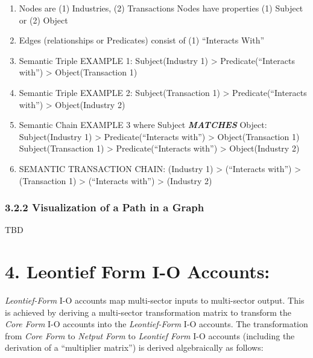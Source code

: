 \documentclass[
  letterpaper,
  DIV=11,
  numbers=noendperiod]{scrreprt}
\begin{document}
\begin{enumerate}
\def\labelenumi{\alph{enumi})}
\item
  Nodes are (1) Industries, (2) Transactions Nodes have properties (1)
  Subject or (2) Object
\item
  Edges (relationships or Predicates) consist of (1) ``Interacts With''
\item
  Semantic Triple EXAMPLE 1: Subject(Industry 1) \textgreater{}
  Predicate(``Interacts with'') \textgreater{} Object(Transaction 1)
\item
  Semantic Triple EXAMPLE 2: Subject(Transaction 1) \textgreater{}
  Predicate(``Interacts with'') \textgreater{} Object(Industry 2)
\item
  Semantic Chain EXAMPLE 3 where Subject \textbf{\emph{MATCHES}} Object:
  Subject(Industry 1) \textgreater{} Predicate(``Interacts with'')
  \textgreater{} Object(Transaction 1) Subject(Transaction 1)
  \textgreater{} Predicate(``Interacts with'') \textgreater{}
  Object(Industry 2)
\item
  SEMANTIC TRANSACTION CHAIN: (Industry 1) \textgreater{} (``Interacts
  with'') \textgreater{} (Transaction 1) \textgreater{} (``Interacts
  with'') \textgreater{} (Industry 2)
\end{enumerate}

\subsubsection{3.2.2 Visualization of a Path in a
Graph}\label{visualization-of-a-path-in-a-graph}

TBD

\section{4. Leontief Form I-O
Accounts:}\label{leontief-form-i-o-accounts}

\emph{Leontief-Form} I-O accounts map multi-sector inputs to
multi-sector output. This is achieved by deriving a multi-sector
transformation matrix to transform the \emph{Core Form} I-O accounts
into the \emph{Leontief-Form} I-O accounts. The transformation from
\emph{Core Form} to \emph{Netput Form} to \emph{Leontief Form} I-O
accounts (including the derivation of a ``multiplier matrix'') is
derived algebraically as follows:
\end{document}
